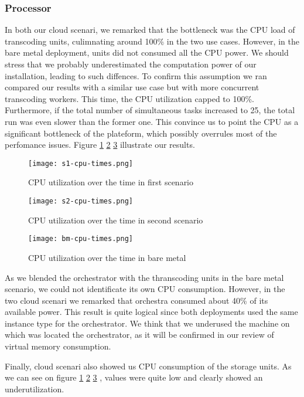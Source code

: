\documentclass[a4paper, titlepage]{paper}
\numberwithin{figure}{section}
\numberwithin{table}{section}
\begin{document}
      \subsubsection{Processor}
        In both our cloud scenari, we remarked that the bottleneck was the CPU load of transcoding units, culimnating around 100\% in the two use cases. However, in the bare metal deployment, units did not consumed all the CPU power. We should stress that we probably underestimated the computation power of our installation, leading to such diffences. To confirm this assumption we ran compared our results with a similar use case but with more concurrent transcoding workers. This time, the CPU utilization capped to 100\%. Furthermore, if the total number of simultaneous tasks increased to 25, the total run was even slower than the former one. This convince us to point the CPU as a significant bottleneck of the plateform, which possibly overrules most of the perfomance issues. Figure \ref{s1ct} \ref{s2ct} \ref{bmct} illustrate our results.
        
        \begin{figure}
          \centering
          \texttt{[image: s1-cpu-times.png]}
          \caption{CPU utilization over the time in first scenario}
          \label{s1ct}
        \end{figure}
        \begin{figure}
          \centering
          \texttt{[image: s2-cpu-times.png]}
          \caption{CPU utilization over the time in second scenario}
          \label{s2ct}
        \end{figure}
        \begin{figure}
          \centering
          \texttt{[image: bm-cpu-times.png]}
          \caption{CPU utilization over the time in bare metal}
          \label{bmct}
        \end{figure}

        As we blended the orchestrator with the thranscoding units in the bare metal scenario, we could not identificate its own CPU consumption. However, in the two cloud scenari we remarked that orchestra consumed about 40\% of its available power. This result is quite logical since both deployments used the same instance type for the orchestrator. We think that we underused the machine on which was located the orchestrator, as it will be confirmed in our review of virtual memory consumption.

        Finally, cloud scenari also showed us CPU consumption of the storage units. As we can see on figure \ref{s1ct} \ref{s2ct} \ref{bmct} , values were quite low and clearly showed an underutilization.
\end{document}
